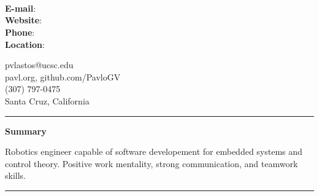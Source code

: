 \documentclass[paper=a4,fontsize=11pt]{article} %
\def \sectionSpace      {0.3cm}    %
\def \leftColSpace      {0.1}       %
\def \bigMiddleColSpace {0.8}       %
\def \lineWidth         {20.25cm}   %
\def \lineThickness     {1pt}     %
\begin{document}
 

    \noindent
    \begin{minipage}[b]{0.625\linewidth}
    \noindent \\
    \noindent \\
    \noindent \\
    \end{minipage}
    \begin{minipage}[b]{0.1\linewidth}
    \noindent \textbf{E-mail}:\\
    \noindent \textbf{Website}:\\
    \noindent \textbf{Phone}:\\
    \noindent \textbf{Location}:
    \end{minipage}
    \begin{minipage}[b]{0.4\linewidth}
    \noindent pvlastos@ucsc.edu\\
    \noindent pavl.org, github.com/PavloGV\\
     (307) 797-0475\\
    \noindent Santa Cruz, California
    \end{minipage}
    \vspace{-0.725cm}

    \vspace{\sectionSpace}
    \noindent\rule{\lineWidth}{\lineThickness}

    \noindent
    \begin{minipage}[t]{\leftColSpace\linewidth}
        \noindent \textbf{Summary}
    \end{minipage}
    \begin{minipage}[t]{\bigMiddleColSpace\linewidth}
        \noindent Robotics engineer capable of software developement for embedded systems and control theory. Positive work mentality, strong communication, and teamwork skills.
    \end{minipage}

    \vspace{\sectionSpace}
    \noindent\rule{\lineWidth}{\lineThickness}
\end{document}
